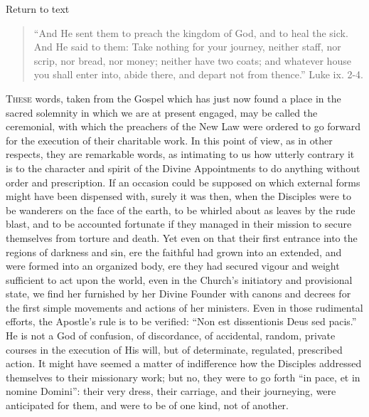Return to text


\begin{quote}

``And He sent them to preach the kingdom of
God, and to heal the sick. And He said to them: Take
nothing for your journey, neither staff, nor scrip,
nor bread, nor money; neither have two coats; and
whatever house you shall enter into, abide there, and
depart not from thence.'' Luke ix. 2-4.

\end{quote}

T\textsc{hese} words, taken from the Gospel which has just now
found a place in the sacred solemnity in which we are at
present engaged, may be called the ceremonial, with which
the preachers of the New Law were ordered to go forward
for the execution of their charitable work. In this point
of view, as in other respects, they are remarkable words,
as intimating to us how utterly contrary it is to the
character and spirit of the Divine Appointments to do
anything without order and prescription. If an occasion
could be supposed on which external forms might have been
dispensed with, surely it was then, when the Disciples
were to be wanderers on the face of the earth, to be
whirled about as leaves by the rude blast, and to be
accounted fortunate if they managed in their mission to
secure themselves from torture and death. Yet even on
that their first entrance into the regions of darkness
and sin, ere the faithful had grown into an extended, and
were formed into an organized body, ere they had secured
vigour and weight sufficient to act upon the world, even
in the Church's initiatory and provisional state, we find
her furnished by her Divine Founder with canons and
decrees for the first simple movements and actions of her
ministers. Even in those rudimental efforts, the
Apostle's rule is to be verified: ``Non est
dissentionis Deus sed pacis.'' He is not a God of
confusion, of discordance, of accidental, random, private
courses in the execution of His will, but of determinate,
regulated, prescribed action. It might have seemed a
matter of indifference how the Disciples addressed
themselves to their missionary work; but no, they were to
go forth ``in pace, et in nomine Domini'': their
very dress, their carriage, and their journeying, were
anticipated for them, and were to be of one kind, not of
another.

